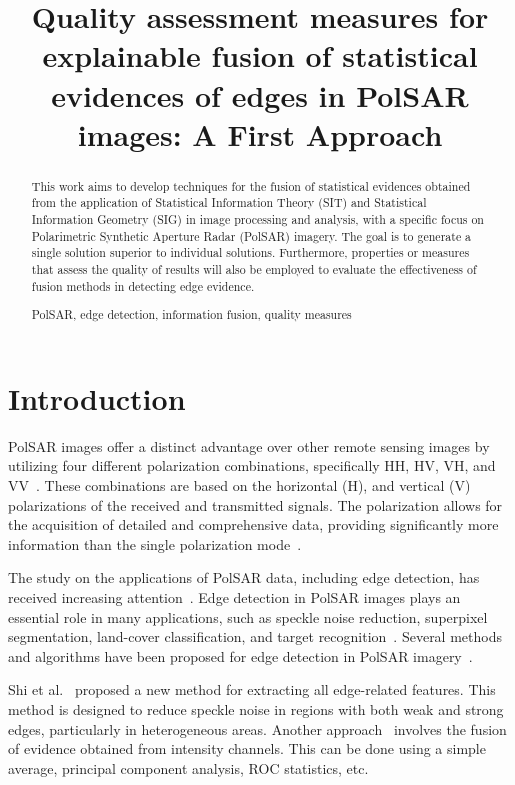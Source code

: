 \documentclass{article}
\title{Quality assessment measures for explainable fusion of statistical evidences of edges in PolSAR images: A First Approach}
\begin{document}
%
\maketitle
%
\begin{abstract}
This work aims to develop techniques for the fusion of statistical evidences obtained from the application of Statistical Information Theory (SIT) and Statistical Information Geometry (SIG) in image processing and analysis, with a specific focus on Polarimetric Synthetic Aperture Radar (PolSAR) imagery. The goal is to generate a single solution superior to individual solutions. Furthermore, properties or measures that assess the quality of results will also be employed to evaluate the effectiveness of fusion methods in detecting edge evidence.

%
\begin{keywords}
PolSAR, edge detection,  information fusion,  quality
measures 
\end{keywords}
%
\end{abstract}
\section{Introduction}
PolSAR images offer a distinct advantage over other remote sensing images by utilizing four different polarization combinations, specifically HH, HV, VH, and VV~\cite{Hua2022}. These combinations are based on the horizontal (H), and vertical (V) polarizations of the received and transmitted signals. The polarization allows for the acquisition of detailed and comprehensive data, providing significantly more information than the single polarization mode~\cite{Zhai2015}.

The study on the applications of PolSAR data, including edge detection, has received increasing attention~\cite{Jin2016,Wang2018}. Edge detection in PolSAR images plays an essential role in many applications, such as speckle noise reduction, superpixel segmentation, land-cover classification, and target recognition~\cite{Xiang2016}. 
Several methods and algorithms have been proposed for edge detection in PolSAR imagery~\cite{Schou2003,Gambini2007,Nascimento2014}. 

Shi et al.~\cite{Shi2020} proposed a new method for extracting all edge-related features. 
This method is designed to reduce speckle noise in regions with both weak and strong edges, particularly in heterogeneous areas. 
Another approach~\cite{DeBorba2020} involves the fusion of evidence obtained from intensity channels. 
This can be done using a simple average, principal component analysis, ROC statistics, etc.
\end{document}

